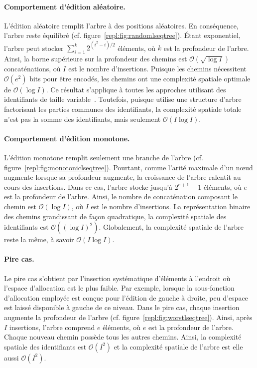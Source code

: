 \paragraph{Comportement d'édition aléatoire. } L'édition aléatoire remplit
l'arbre à des positions aléatoires. En conséquence, l'arbre reste équilibré
(cf. figure~\ref{repl:fig:randomlseqtree}). Étant exponentiel, l'arbre peut
stocker $\textstyle\sum\nolimits_{i=1}^{k}{2^{(i^2-i)/2}}$ éléments, où $k$ est
la profondeur de l'arbre. Ainsi, la borne supérieure sur la profondeur des
chemins est $\mathcal{O}(\sqrt{\log I})$ concaténations, où $I$ est le nombre
d'insertions. Puisque les chemins nécessitent $\mathcal{O}(e^2)$ bits pour être
encodés, les chemins ont une complexité spatiale optimale de
$\mathcal{O}(\log I)$. Ce résultat s'applique à toutes les approches utilisant
des identifiants de taille variable~\cite{preguica2009commutative,
  weiss2009logoot}. Toutefois, puisque \LSEQ utilise une structure d'arbre
factorisant les parties communes des identifiants, la complexité spatiale totale
n'est pas la somme des identifiants, mais seulement $\mathcal{O}(I\log I)$.

\paragraph{Comportement d'édition monotone.} L'édition monotone remplit
seulement une branche de l'arbre
(cf. figure~\ref{repl:fig:monotoniclseqtree}). Pourtant, comme l'arité maximale
d'un nœud augmente lorsque sa profondeur augmente, la croissance de l'arbre
ralentit au cours des insertions. Dans ce cas, l'arbre stocke jusqu'à
$2^{e+1}-1$ éléments, où $e$ est la profondeur de l'arbre. Ainsi, le nombre de
concaténation composant le chemin est $\mathcal{O}(\log I)$, où $I$ est le
nombre d'insertions. La représentation binaire des chemins grandissant de façon
quadratique, la complexité spatiale des identifiants est
$\mathcal{O}((\log I)^2)$. Globalement, la complexité spatiale de l'arbre reste
la même, à savoir $\mathcal{O}(I \log I)$.

\paragraph{Pire cas.} Le pire cas s'obtient par l'insertion systématique
d'éléments à l'endroit où l'espace d'allocation est le plus faible. Par exemple,
lorsque la sous-fonction d'allocation employée est conçue pour l'édition de
gauche à droite, peu d'espace est laissé disponible à gauche de ce niveau.  Dans
le pire cas, chaque insertion augmente la profondeur de l'arbre
(cf. figure~\ref{repl:fig:worstlseqtree}). Ainsi, après $I$ insertions, l'arbre
comprend $e$ éléments, où $e$ est la profondeur de l'arbre. Chaque nouveau
chemin possède tous les autres chemins. Ainsi, la complexité spatiale des
identifiants est $\mathcal{O}(I^2)$ et la complexité spatiale de l'arbre est
elle aussi $\mathcal{O}(I^2)$.

